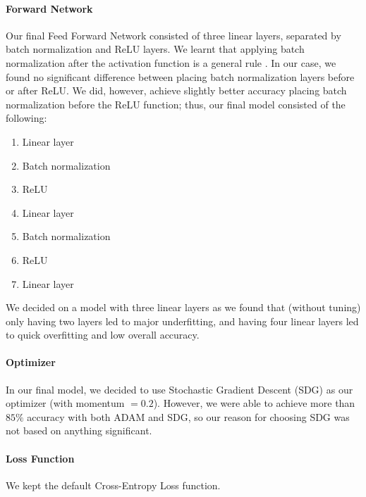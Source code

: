 \documentclass[11pt]{article}
\begin{document}
\paragraph{\noindent\textbf{\LARGE{Forward Network}}}
\begin{flushleft}
    Our final Feed Forward Network consisted of three linear layers, 
    separated by batch normalization and ReLU layers. 
    We learnt that applying batch normalization after the activation function is a 
    general rule \cite{Normalization}. 
    \newline
    \newline
    In our case, we found no significant difference between placing 
    batch normalization layers before or after ReLU. We did, however, 
    achieve slightly better accuracy placing batch normalization before the ReLU 
    function; thus, our final model consisted of the following: 
    \begin{enumerate}
        \item Linear layer
        \item Batch normalization
        \item ReLU
        \item Linear layer
        \item Batch normalization
        \item ReLU
        \item Linear layer
    \end{enumerate}
    We decided on a model with three linear layers as we found that (without tuning) 
    only having two layers led to major underfitting, and having four linear layers 
    led to quick overfitting and low overall accuracy.
\end{flushleft} 

\paragraph{\noindent\textbf{\LARGE{Optimizer}}}
\begin{flushleft}
    In our final model, we decided to use Stochastic Gradient Descent (SDG) as 
    our optimizer (with momentum $=0.2$). However, we were able to achieve more than $85\%$ 
    accuracy with both ADAM and SDG, so our reason for choosing SDG was not 
    based on anything significant.
\end{flushleft} 
\paragraph{\noindent\textbf{\LARGE{Loss Function}}}
\begin{flushleft}
    We kept the default Cross-Entropy Loss function. 
\end{flushleft} 
\end{document}
